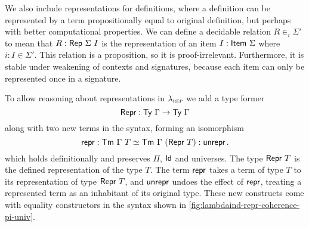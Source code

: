 We also include representations for definitions, where a definition can be
represented by a term propositionally equal to original definition, but perhaps
with better computational properties.
We can define a decidable relation $R \in_i \Sigma'$ to mean that $R :
\textsf{Rep}\ \Sigma\ I$ is the representation of an item $I : \textsf{Item}\ \Sigma$
where $i : I \in \Sigma'$.
This relation is a proposition, so it is proof-irrelevant. Furthermore, it is stable under
weakening of contexts and signatures, because each item can only be represented once in a signature.



To allow reasoning about representations in $\lambda_{\textsc{rep}}$ we add a type former
\begin{equation}\label{eq:repr-ty}
	\textsf{Repr}{} : \textsf{Ty}\ \Gamma \to \textsf{Ty}\ \Gamma
\end{equation}
along with two new terms in the syntax, forming an isomorphism
\begin{equation}\label{eq:repr-iso}
	\textsf{repr}{} : \textsf{Tm}\ \Gamma\ T \simeq \textsf{Tm}\ \Gamma\ (\textsf{Repr}\ T) : \textsf{unrepr}{} \,.
\end{equation}
which holds definitionally and preserves $\Pi$, $\textsf{Id}$ and universes. The
type $\MRepr\ T$ is the defined representation of the type $T$. The term
$\textsf{repr}{}$ takes a term of type $T$ to its representation of type $\MRepr\ T$,
and $\textsf{unrepr}{}$ undoes the
effect of $\textsf{repr}{}$, treating a represented term as an inhabitant of its
original type. These new constructs come with equality constructors in the syntax
shown in \cref{fig:lambdaind-repr-coherence-pi-univ}.



